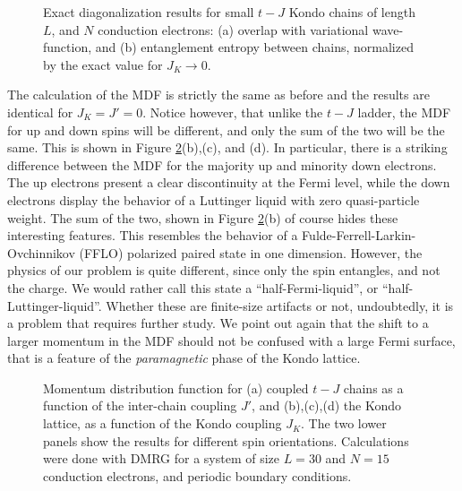 \documentclass[article,11pt]{revtex4}
\begin{document}
\begin{centering}
\begin{figure}
\caption{Exact diagonalization results for small $t-J$ Kondo chains of length $L$, and $N$ conduction electrons: (a) overlap with variational wave-function, and (b) entanglement entropy between chains, normalized by the exact value for $J_K\rightarrow0$.} 
\label{fig:kondo}
\end{figure}
\end{centering}



The calculation of the MDF is strictly the same as before and the results are identical for $J_K=J'=0$. Notice however, that unlike the $t-J$ ladder, the MDF for up and down spins will be different, and only the sum of the two will be the same. This is shown in Figure \ref{fig:mdf}(b),(c), and (d). In particular, there is a striking difference between the MDF for the majority up and minority down electrons. The up electrons present a clear discontinuity at the Fermi level, while the down electrons display the behavior of a Luttinger liquid with zero quasi-particle weight. The sum of the two, shown in Figure \ref{fig:mdf}(b) of course hides these interesting features. This resembles the behavior of a Fulde-Ferrell-Larkin-Ovchinnikov (FFLO) polarized paired state in one dimension\cite{Yang2001,Orso2007,Feiguin2007c,Feiguin2009b,Heidrich-Meisner2010,Lutchyn2011,Dalmonte2012}. However, the physics of our problem is quite different, since only the spin entangles, and not the charge. We would rather call this state a ``half-Fermi-liquid'', or ``half-Luttinger-liquid''. Whether these are finite-size artifacts or not, undoubtedly, it is a problem that requires further study.
We point out again that the shift to a larger momentum in the MDF should not be confused with a large Fermi surface, that is a feature of the {\it paramagnetic} phase of the Kondo lattice. 

\begin{centering}
\begin{figure}
\caption{Momentum distribution function for (a) coupled $t-J$ chains as a function of the inter-chain coupling $J'$, and (b),(c),(d) the Kondo lattice, as a function of the Kondo coupling $J_K$. The two lower panels show the results for different spin orientations. Calculations were done with DMRG for a system of size $L=30$ and $N=15$ conduction electrons, and periodic boundary conditions.} 
\label{fig:mdf}
\end{figure}
\end{centering}
\end{document}
